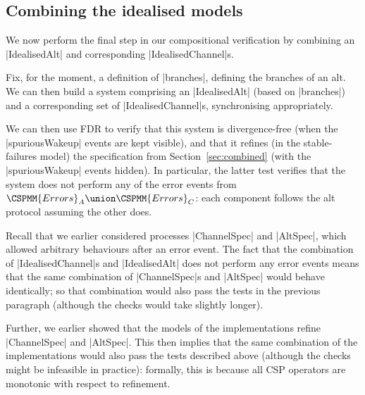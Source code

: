 \subsection{Combining the idealised models}

We now perform the final step in our compositional verification by combining
an |IdealisedAlt| and corresponding |IdealisedChannel|s.

Fix, for the moment, a definition of |branches|, defining the branches of an
alt.  We can then build a system comprising an |IdealisedAlt| (based on
|branches|) and a corresponding set of |IdealisedChannel|s, synchronising
appropriately.

We can then use FDR to verify that this system is divergence-free (when the
|spuriousWakeup| events are kept visible), and that it refines (in the
stable-failures model) the specification from Section~\ref{sec:combined} (with
the |spuriousWakeup| events hidden).  In particular, the latter test verifies
that the system does not perform any of the error events
from~$\CSPMM{Errors}_A \union \CSPMM{Errors}_C$: each component follows the
alt protocol assuming the other does. 

Recall that we earlier considered processes |ChannelSpec| and |AltSpec|, which
allowed arbitrary behaviours after an error event.  The fact that the
combination of |IdealisedChannel|s and |IdealisedAlt| does not perform any
error events means that the same combination of |ChannelSpec|s and |AltSpec|
would behave identically; so that combination would also pass the tests in the
previous paragraph (although the checks would take slightly longer).

Further, we earlier showed that the models of the implementations refine
|ChannelSpec| and |AltSpec|.  This then implies that the same combination of
the implementations would also pass the tests described above (although the
checks might be infeasible in practice): formally, this is because all CSP
operators are monotonic with respect to refinement.

